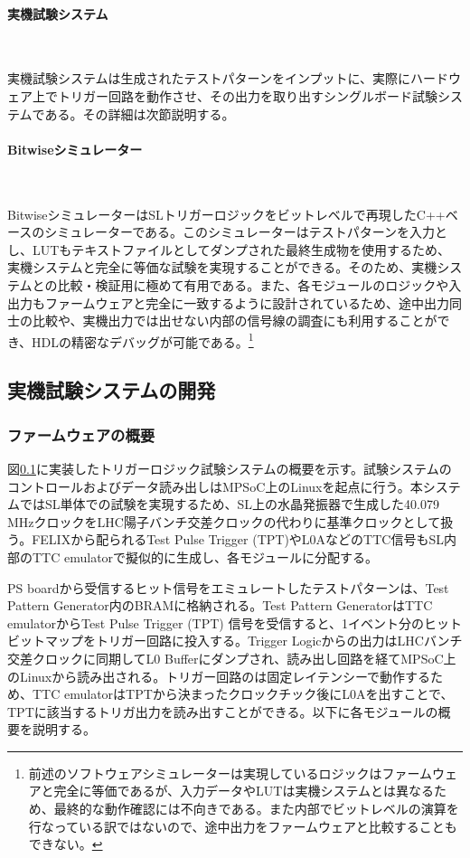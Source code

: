 \paragraph{実機試験システム}　　
\par
実機試験システムは生成されたテストパターンをインプットに、実際にハードウェア上でトリガー回路を動作させ、その出力を取り出すシングルボード試験システムである。その詳細は次節説明する。

\paragraph{Bitwiseシミュレーター}　　
\par
BitwiseシミュレーターはSLトリガーロジックをビットレベルで再現したC++ベースのシミュレーターである。このシミュレーターはテストパターンを入力とし、LUTもテキストファイルとしてダンプされた最終生成物を使用するため、実機システムと完全に等価な試験を実現することができる。そのため、実機システムとの比較・検証用に極めて有用である。また、各モジュールのロジックや入出力もファームウェアと完全に一致するように設計されているため、途中出力同士の比較や、実機出力では出せない内部の信号線の調査にも利用することができ、HDLの精密なデバッグが可能である。\footnote{前述のソフトウェアシミュレーターは実現しているロジックはファームウェアと完全に等価であるが、入力データやLUTは実機システムとは異なるため、最終的な動作確認には不向きである。また内部でビットレベルの演算を行なっている訳ではないので、途中出力をファームウェアと比較することもできない。}

\subsection{実機試験システムの開発}
\subsubsection*{ファームウェアの概要}
図\ref{}に実装したトリガーロジック試験システムの概要を示す。試験システムのコントロールおよびデータ読み出しはMPSoC上のLinuxを起点に行う。本システムではSL単体での試験を実現するため、SL上の水晶発振器で生成した40.079 MHzクロックをLHC陽子バンチ交差クロックの代わりに基準クロックとして扱う。FELIXから配られるTest Pulse Trigger (TPT)やL0AなどのTTC信号もSL内部のTTC emulatorで擬似的に生成し、各モジュールに分配する。

PS boardから受信するヒット信号をエミュレートしたテストパターンは、Test Pattern Generator内のBRAMに格納される。Test Pattern GeneratorはTTC emulatorからTest Pulse Trigger (TPT) 信号を受信すると、1イベント分のヒットビットマップをトリガー回路に投入する。Trigger Logicからの出力はLHCバンチ交差クロックに同期してL0 Bufferにダンプされ、読み出し回路を経てMPSoC上のLinuxから読み出される。トリガー回路のは固定レイテンシーで動作するため、TTC emulatorはTPTから決まったクロックチック後にL0Aを出すことで、TPTに該当するトリガ出力を読み出すことができる。以下に各モジュールの概要を説明する。

